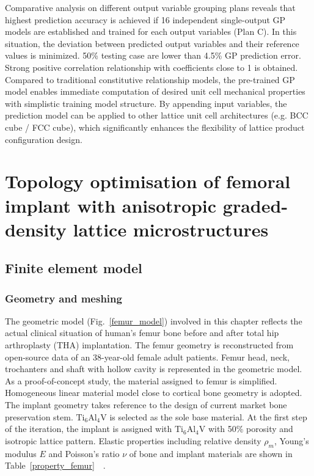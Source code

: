 \documentclass[12pt]{extbook}
\begin{document}
Comparative analysis on different output variable grouping plans reveals that highest prediction accuracy is achieved if 16 independent single-output GP models are established and trained for each output variables (Plan C). In this situation, the deviation between predicted output variables and their reference values is minimized. 50\% testing case are lower than 4.5\% GP prediction error. Strong positive correlation relationship with coefficients close to 1 is obtained.\\

Compared to traditional constitutive relationship models, the pre-trained GP model enables immediate computation of desired unit cell mechanical properties with simplistic training model structure. By appending input variables, the prediction model can be applied to other lattice unit cell architectures (e.g. BCC cube / FCC cube), which significantly enhances the flexibility of lattice product configuration design.\\



\chapter{Topology optimisation of femoral implant with anisotropic graded-density lattice microstructures}
\label{femur}

\section{Finite element model}
\label{femur_mode}

\subsection{Geometry and meshing}

The geometric model (Fig.~\ref{femur_model}) involved in this chapter reflects the actual clinical situation of human's femur bone before and after total hip arthroplasty (THA) implantation. The femur geometry is reconstructed from open-source data of an 38-year-old female adult patients. Femur head, neck, trochanters and shaft with hollow cavity is represented in the geometric model. As a proof-of-concept study, the material assigned to femur is simplified. Homogeneous linear material model close to cortical bone geometry is adopted. The implant geometry takes reference to the design of current market bone preservation stem. $\text{Ti}_6\text{Al}_4\text{V}$ is selected as the sole base material. At the first step of the iteration, the implant is assigned with $\text{Ti}_6\text{Al}_4\text{V}$ with 50\% porosity and isotropic lattice pattern. Elastic properties including relative density $\rho_m$, Young's modulus $E$ and Poisson's ratio $\nu$ of bone and implant materials are shown in Table~\ref{property_femur}~\cite{bandyopadhyay2010influence}~\cite{wirtz2000critical}.\\
\end{document}
